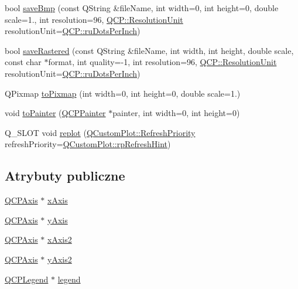 \begin{DoxyCompactItemize}
\item 
bool \hyperlink{class_q_custom_plot_ae3a86ed0795670e50afa21759d4fa13d}{save\+Bmp} (const Q\+String \&file\+Name, int width=0, int height=0, double scale=1., int resolution=96, \hyperlink{namespace_q_c_p_a715d46153da230990aa887d0f0602452}{Q\+C\+P\+::\+Resolution\+Unit} resolution\+Unit=\hyperlink{namespace_q_c_p_a715d46153da230990aa887d0f0602452affb887d8efe79c39a1aca2acd7002afc}{Q\+C\+P\+::ru\+Dots\+Per\+Inch})
\item 
bool \hyperlink{class_q_custom_plot_ad7723ce2edfa270632ef42b03a444352}{save\+Rastered} (const Q\+String \&file\+Name, int width, int height, double scale, const char $\ast$format, int quality=-\/1, int resolution=96, \hyperlink{namespace_q_c_p_a715d46153da230990aa887d0f0602452}{Q\+C\+P\+::\+Resolution\+Unit} resolution\+Unit=\hyperlink{namespace_q_c_p_a715d46153da230990aa887d0f0602452affb887d8efe79c39a1aca2acd7002afc}{Q\+C\+P\+::ru\+Dots\+Per\+Inch})
\item 
Q\+Pixmap \hyperlink{class_q_custom_plot_aabb974d71ce96c137dc04eb6eab844fe}{to\+Pixmap} (int width=0, int height=0, double scale=1.)
\item 
void \hyperlink{class_q_custom_plot_a1be68d5c0f1e086d6374d1340a193fb9}{to\+Painter} (\hyperlink{class_q_c_p_painter}{Q\+C\+P\+Painter} $\ast$painter, int width=0, int height=0)
\item 
Q\+\_\+\+S\+L\+OT void \hyperlink{class_q_custom_plot_aa4bfe7d70dbe67e81d877819b75ab9af}{replot} (\hyperlink{class_q_custom_plot_a45d61392d13042e712a956d27762aa39}{Q\+Custom\+Plot\+::\+Refresh\+Priority} refresh\+Priority=\hyperlink{class_q_custom_plot_a45d61392d13042e712a956d27762aa39a49666a5854a68dbcca8b277b03331260}{Q\+Custom\+Plot\+::rp\+Refresh\+Hint})
\end{DoxyCompactItemize}
\subsection*{Atrybuty publiczne}
\begin{DoxyCompactItemize}
\item 
\hyperlink{class_q_c_p_axis}{Q\+C\+P\+Axis} $\ast$ \hyperlink{class_q_custom_plot_a9a79cd0158a4c7f30cbc702f0fd800e4}{x\+Axis}
\item 
\hyperlink{class_q_c_p_axis}{Q\+C\+P\+Axis} $\ast$ \hyperlink{class_q_custom_plot_af6fea5679725b152c14facd920b19367}{y\+Axis}
\item 
\hyperlink{class_q_c_p_axis}{Q\+C\+P\+Axis} $\ast$ \hyperlink{class_q_custom_plot_ada41599f22cad901c030f3dcbdd82fd9}{x\+Axis2}
\item 
\hyperlink{class_q_c_p_axis}{Q\+C\+P\+Axis} $\ast$ \hyperlink{class_q_custom_plot_af13fdc5bce7d0fabd640f13ba805c0b7}{y\+Axis2}
\item 
\hyperlink{class_q_c_p_legend}{Q\+C\+P\+Legend} $\ast$ \hyperlink{class_q_custom_plot_a4eadcd237dc6a09938b68b16877fa6af}{legend}
\end{DoxyCompactItemize}
